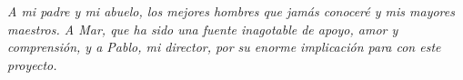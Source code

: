 \textit{A mi padre y mi abuelo, los mejores hombres que jamás conoceré y mis mayores maestros. A Mar, que ha sido una fuente inagotable de apoyo, amor y comprensión, y a Pablo, mi director, por su enorme implicación para con este proyecto.}